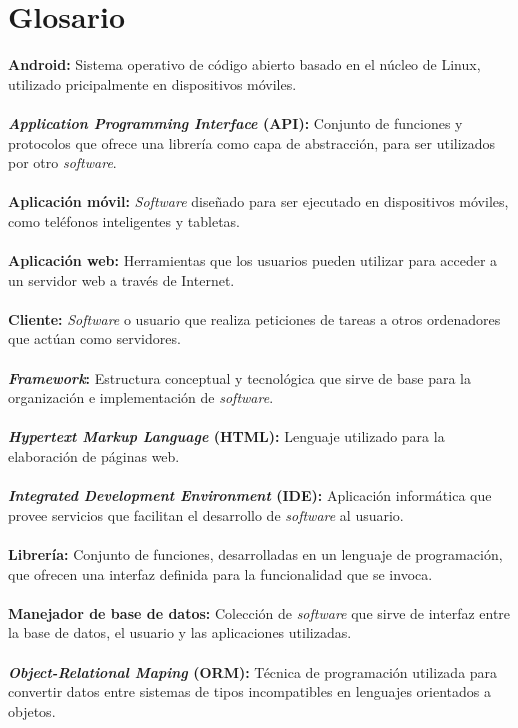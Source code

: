 \chapter*{Glosario}
\noindent
\textbf{Android:} Sistema operativo de código abierto basado en el núcleo de Linux, utilizado pricipalmente en dispositivos móviles.\\ 	\\
\textbf{\textit{Application Programming Interface} (API):} Conjunto de funciones y protocolos que ofrece una librería como capa de abstracción, para ser utilizados por otro \textit{software}.\\ \\
\textbf{Aplicación móvil:} \textit{Software} diseñado para ser ejecutado en dispositivos móviles, como teléfonos inteligentes y tabletas.\\ \\
\textbf{Aplicación web:} Herramientas que los usuarios pueden utilizar para acceder a un servidor web a través de Internet.\\ \\
\textbf{Cliente:} \textit{Software} o usuario que realiza peticiones de tareas a otros ordenadores que actúan como servidores.\\ \\
\textbf{\textit{Framework}:} Estructura conceptual y tecnológica que sirve de base para la organización e implementación de \textit{software}.\\ \\
\textbf{\textit{Hypertext Markup Language} (HTML):} Lenguaje utilizado para la elaboración de páginas web.\\ \\
\textbf{\textit{Integrated Development Environment} (IDE):} Aplicación informática que provee servicios que facilitan el desarrollo de \textit{software} al usuario.\\ \\
\textbf{Librería:} Conjunto de funciones, desarrolladas en un lenguaje de programación, que ofrecen una interfaz definida para la funcionalidad que se invoca.\\ \\
\textbf{Manejador de base de datos:} Colección de \textit{software} que sirve de interfaz entre la base de datos, el usuario y las aplicaciones utilizadas.\\ \\
\textbf{\textit{Object-Relational Maping} (ORM):} Técnica de programación utilizada para convertir datos entre sistemas de tipos incompatibles en lenguajes orientados a objetos.\\ \\
